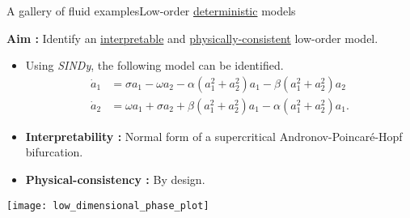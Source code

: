 \begin{frame}[t, c]{A gallery of fluid examples}{Low-order \underline{deterministic} models}
	\begin{minipage}{.58\textwidth}

		\begin{block}{}
			\textbf{Aim :} Identify an \underline{interpretable} and \underline{physically-consistent} low-order model.
		\end{block}

		\medskip

		\begin{itemize}
			\item Using \emph{SINDy}, the following model can be identified.
			\[
				\begin{aligned}
					\dot{a}_1 & = \sigma a_1 - \omega a_2 - \alpha (a_1^2 + a_2^2) a_1 - \beta (a_1^2 + a_2^2) a_2 \\
					\dot{a}_2 & = \omega a_1 + \sigma a_2 + \beta (a_1^2 + a_2^2) a_1 - \alpha (a_1^2 + a_2^2) a_1.
				\end{aligned}
			\]

			\item \textbf{Interpretability :} Normal form of a supercritical Andronov-Poincaré-Hopf bifurcation.

			\item \textbf{Physical-consistency :} By design.
		\end{itemize}
	\end{minipage}%
	\hfill
	\begin{minipage}{.38\textwidth}
		\centering
		\texttt{[image: low\_dimensional\_phase\_plot]}
	\end{minipage}

	\vspace{1cm}
\end{frame}

